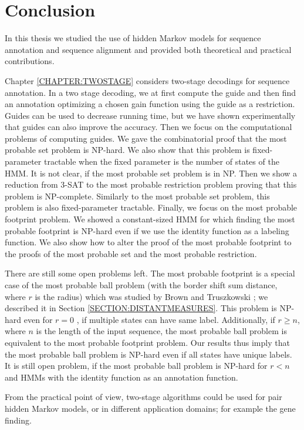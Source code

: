 \chapter{Conclusion}

In this thesis we studied the use of hidden Markov models for sequence
annotation and sequence alignment and provided both theoretical and practical
contributions.

Chapter \ref{CHAPTER:TWOSTAGE} considers two-stage decodings for sequence
annotation. In a two stage decoding, we at first compute the guide and then find
an annotation optimizing a chosen gain function using the guide as a restriction. Guides
can be used to decrease running time, but we have shown experimentally that
guides can also improve the accuracy. Then we focus on the computational
problems of computing guides.  We gave the combinatorial proof that the most
probable set problem is NP-hard.  We also show that this problem is
fixed-parameter tractable when the fixed parameter is the number of states of
the HMM. It is not clear, if the most probable set problem is in NP. Then we
show a reduction from 3-SAT to the most probable restriction problem proving
that this problem is NP-complete. Similarly to the most probable set problem,
this problem is also fixed-parameter tractable.  Finally, we focus on the most
probable footprint problem.  We showed a constant-sized HMM for which finding
the most probable footprint is NP-hard even if we use the identity function as
a labeling function. We also show how to alter the proof of the most probable
footprint to the proofs of the most probable set and the most probable
restriction. 

There are still some open problems left. The most probable footprint is a
special case of the most probable ball problem (with the border shift sum
distance, where $r$ is the radius) which was studied by Brown and Truszkowski
\cite{Brown2010}; we described it in Section \ref{SECTION:DISTANTMEASURES}.
This problem is NP-hard even for $r=0$ \cite{Brown2010}, if multiple states can
have same label. Additionally, if $r\geq n$, where $n$ is the length of the
input sequence, the most probable ball problem is equivalent to the most
probable footprint problem. Our results thus imply that the most probable ball
problem is NP-hard even if all states have unique labels. It is still open
problem, if the most probable ball problem is NP-hard for $r<n$ and HMMs with
the identity function as an annotation function. 

From the practical point of view, two-stage algorithms  could be used
for pair hidden Markov models, or in different application domains; for example
the gene finding.

